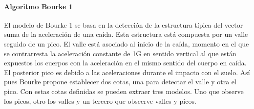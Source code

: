 


\paragraph{Algoritmo Bourke 1} El modelo de Bourke 1\cite{Bourke2006} se basa en la detección de la estructura típica del vector suma de la aceleración de una caída. Esta estructura está compuesta por un valle seguido de un pico. El valle está asociado al inicio de la caída, momento en el que se contrarresta la aceleración constante de 1G en sentido vertical al que están expuestos los cuerpos con la aceleración en el mismo sentido del cuerpo en caída. El posterior pico es debido a las aceleraciones durante el impacto con el suelo. Así pues Bourke propone establecer dos cotas, una para detectar el valle y otra el pico. Con estas cotas definidas se pueden extraer tres modelos. Uno que observe los picos, otro los valles y un tercero que obseerve valles y picos.

